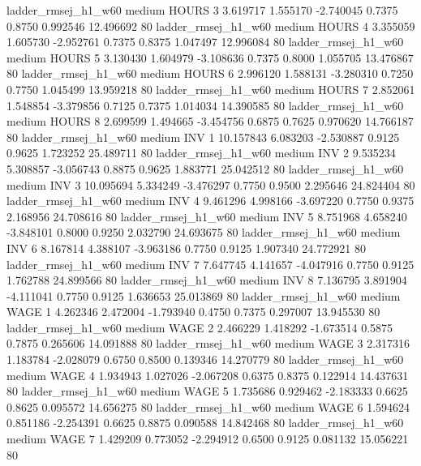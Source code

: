    ladder_rmsej_h1_w60     medium    HOURS                 3  3.619717 1.555170 -2.740045 0.7375 0.8750  0.992546   12.496692 80
   ladder_rmsej_h1_w60     medium    HOURS                 4  3.355059 1.605730 -2.952761 0.7375 0.8375  1.047497   12.996084 80
   ladder_rmsej_h1_w60     medium    HOURS                 5  3.130430 1.604979 -3.108636 0.7375 0.8000  1.055705   13.476867 80
   ladder_rmsej_h1_w60     medium    HOURS                 6  2.996120 1.588131 -3.280310 0.7250 0.7750  1.045499   13.959218 80
   ladder_rmsej_h1_w60     medium    HOURS                 7  2.852061 1.548854 -3.379856 0.7125 0.7375  1.014034   14.390585 80
   ladder_rmsej_h1_w60     medium    HOURS                 8  2.699599 1.494665 -3.454756 0.6875 0.7625  0.970620   14.766187 80
   ladder_rmsej_h1_w60     medium      INV                 1 10.157843 6.083203 -2.530887 0.9125 0.9625  1.723252   25.489711 80
   ladder_rmsej_h1_w60     medium      INV                 2  9.535234 5.308857 -3.056743 0.8875 0.9625  1.883771   25.042512 80
   ladder_rmsej_h1_w60     medium      INV                 3 10.095694 5.334249 -3.476297 0.7750 0.9500  2.295646   24.824404 80
   ladder_rmsej_h1_w60     medium      INV                 4  9.461296 4.998166 -3.697220 0.7750 0.9375  2.168956   24.708616 80
   ladder_rmsej_h1_w60     medium      INV                 5  8.751968 4.658240 -3.848101 0.8000 0.9250  2.032790   24.693675 80
   ladder_rmsej_h1_w60     medium      INV                 6  8.167814 4.388107 -3.963186 0.7750 0.9125  1.907340   24.772921 80
   ladder_rmsej_h1_w60     medium      INV                 7  7.647745 4.141657 -4.047916 0.7750 0.9125  1.762788   24.899566 80
   ladder_rmsej_h1_w60     medium      INV                 8  7.136795 3.891904 -4.111041 0.7750 0.9125  1.636653   25.013869 80
   ladder_rmsej_h1_w60     medium     WAGE                 1  4.262346 2.472004 -1.793940 0.4750 0.7375  0.297007   13.945530 80
   ladder_rmsej_h1_w60     medium     WAGE                 2  2.466229 1.418292 -1.673514 0.5875 0.7875  0.265606   14.091888 80
   ladder_rmsej_h1_w60     medium     WAGE                 3  2.317316 1.183784 -2.028079 0.6750 0.8500  0.139346   14.270779 80
   ladder_rmsej_h1_w60     medium     WAGE                 4  1.934943 1.027026 -2.067208 0.6375 0.8375  0.122914   14.437631 80
   ladder_rmsej_h1_w60     medium     WAGE                 5  1.735686 0.929462 -2.183333 0.6625 0.8625  0.095572   14.656275 80
   ladder_rmsej_h1_w60     medium     WAGE                 6  1.594624 0.851186 -2.254391 0.6625 0.8875  0.090588   14.842468 80
   ladder_rmsej_h1_w60     medium     WAGE                 7  1.429209 0.773052 -2.294912 0.6500 0.9125  0.081132   15.056221 80
